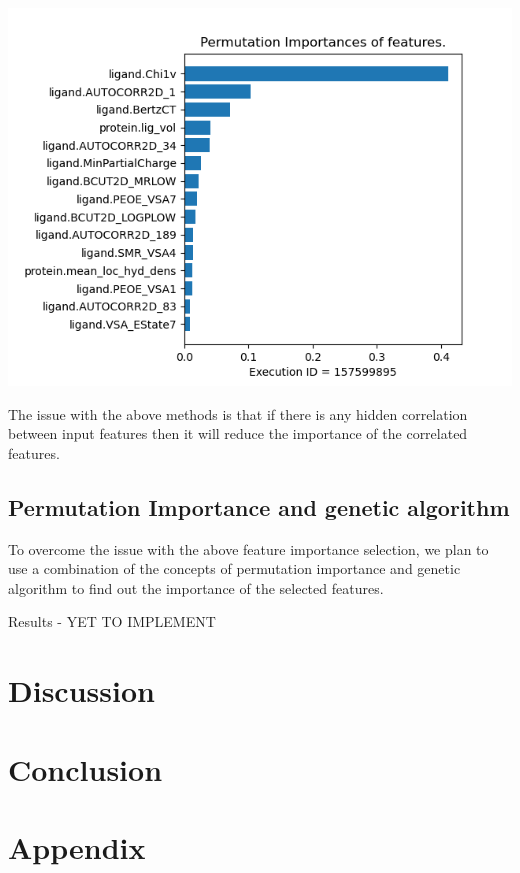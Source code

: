 \documentclass[11pt]{article}
\begin{document}
\includegraphics[scale=0.7]{Permutation_importance}

The issue with the above methods is that if there is any hidden correlation between input features then it will reduce the importance of the correlated features.

\subsection{Permutation Importance and genetic algorithm}
To overcome the issue with the above feature importance selection, we plan to use a combination of the concepts of permutation importance and genetic algorithm to find out the importance of the selected features.

Results - YET TO IMPLEMENT

\section{Discussion}


\section{Conclusion}




\section{Appendix}
\end{document}
